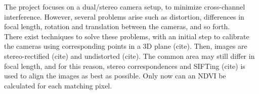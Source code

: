 The project focuses on a dual/stereo camera setup, to minimize cross-channel interference. However, several problems arise such as distortion, differences in focal length, rotation and translation between the cameras, and so forth.\\

There exist techniques to solve these problems, with an initial step to calibrate the cameras using corresponding points in a 3D plane (cite). Then, images are stereo-rectified (cite) and undistorted (cite). The common area may still differ in focal length, and for this reason, stereo correspondences and SIFTing (cite) is used to align the images as best as possible. Only now can an NDVI be calculated for each matching pixel.

